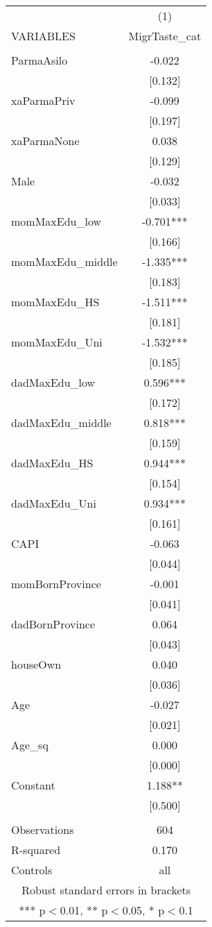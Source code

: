 \documentclass[]{article}
\begin{document}
\begin{tabular}{lc} \hline
 & (1) \\
VARIABLES & MigrTaste\_cat \\ \hline
 &  \\
ParmaAsilo & -0.022 \\
 & [0.132] \\
xaParmaPriv & -0.099 \\
 & [0.197] \\
xaParmaNone & 0.038 \\
 & [0.129] \\
Male & -0.032 \\
 & [0.033] \\
momMaxEdu\_low & -0.701*** \\
 & [0.166] \\
momMaxEdu\_middle & -1.335*** \\
 & [0.183] \\
momMaxEdu\_HS & -1.511*** \\
 & [0.181] \\
momMaxEdu\_Uni & -1.532*** \\
 & [0.185] \\
dadMaxEdu\_low & 0.596*** \\
 & [0.172] \\
dadMaxEdu\_middle & 0.818*** \\
 & [0.159] \\
dadMaxEdu\_HS & 0.944*** \\
 & [0.154] \\
dadMaxEdu\_Uni & 0.934*** \\
 & [0.161] \\
CAPI & -0.063 \\
 & [0.044] \\
momBornProvince & -0.001 \\
 & [0.041] \\
dadBornProvince & 0.064 \\
 & [0.043] \\
houseOwn & 0.040 \\
 & [0.036] \\
Age & -0.027 \\
 & [0.021] \\
Age\_sq & 0.000 \\
 & [0.000] \\
Constant & 1.188** \\
 & [0.500] \\
 &  \\
Observations & 604 \\
R-squared & 0.170 \\
 Controls & all \\ \hline
\multicolumn{2}{c}{ Robust standard errors in brackets} \\
\multicolumn{2}{c}{ *** p$<$0.01, ** p$<$0.05, * p$<$0.1} \\
\end{tabular}
\end{document}
